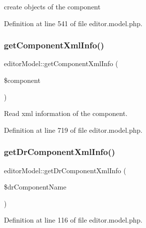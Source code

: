 create objects of the component 



Definition at line 541 of file editor.\+model.\+php.

\mbox{\label{classeditorModel_ade91abf13956321e293195f2f14b4e2b}} 
\subsubsection{\texorpdfstring{get\+Component\+Xml\+Info()}{getComponentXmlInfo()}}
{\footnotesize\ttfamily editor\+Model\+::get\+Component\+Xml\+Info (\begin{DoxyParamCaption}\item[{}]{\$component }\end{DoxyParamCaption})}



Read xml information of the component. 



Definition at line 719 of file editor.\+model.\+php.

\mbox{\label{classeditorModel_a580e31ed0fff869a97d5fe598975e960}} 
\subsubsection{\texorpdfstring{get\+Dr\+Component\+Xml\+Info()}{getDrComponentXmlInfo()}}
{\footnotesize\ttfamily editor\+Model\+::get\+Dr\+Component\+Xml\+Info (\begin{DoxyParamCaption}\item[{}]{\$dr\+Component\+Name }\end{DoxyParamCaption})}



Definition at line 116 of file editor.\+model.\+php.

\mbox{\label{classeditorModel_a77477c0a6d333b3230f77904d96d93c5}} 
